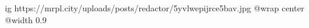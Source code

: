  
 
 
 
 

\ifcmt
  ig https://mrpl.city/uploads/posts/redactor/5yvlwepijrce5bav.jpg
  @wrap center
  @width 0.9
\fi

